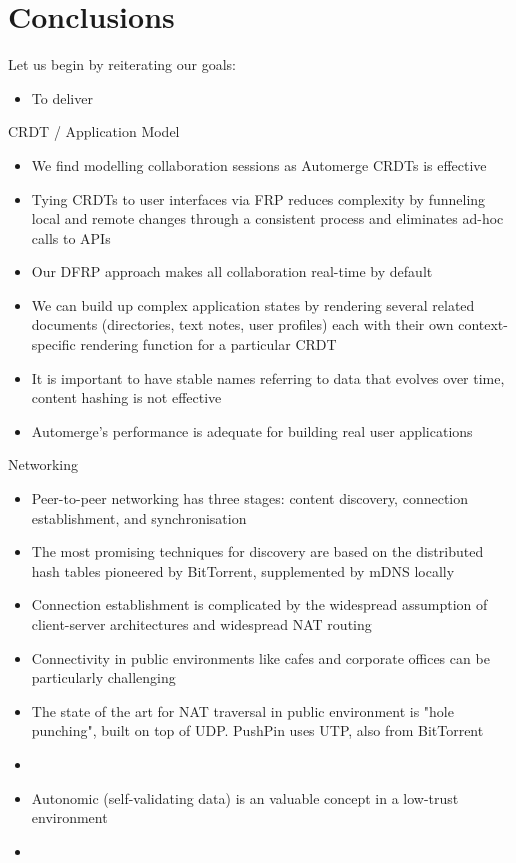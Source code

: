 \documentclass[sigplan,10pt]{acmart}
\begin{document}
\section{Conclusions}

Let us begin by reiterating our goals:
\begin{itemize}
    \item To deliver 
\end{itemize}

CRDT / Application Model
\begin{itemize}
	\item We find modelling collaboration sessions as Automerge CRDTs is effective
	\item Tying CRDTs to user interfaces via FRP reduces complexity by funneling local and remote changes through a consistent process and eliminates ad-hoc calls to APIs
	\item Our DFRP approach makes all collaboration real-time by default
	\item We can build up complex application states by rendering several related documents (directories, text notes, user profiles) each with their own context-specific rendering function for a particular CRDT
	\item It is important to have stable names referring to data that evolves over time, content hashing is not effective
	\item Automerge's performance is adequate for building real user applications
\end{itemize}

Networking
\begin{itemize}
    \item Peer-to-peer networking has three stages: content discovery, connection establishment, and synchronisation
    \item The most promising techniques for discovery are based on the distributed hash tables pioneered by BitTorrent, supplemented by mDNS locally
    \item Connection establishment is complicated by the widespread assumption of client-server architectures and widespread NAT routing
    \item Connectivity in public environments like cafes and corporate offices can be particularly challenging 
    \item The state of the art for NAT traversal in public environment is "hole punching", built on top of UDP. PushPin uses UTP, also from BitTorrent
    \item 
    \item Autonomic (self-validating data) is an valuable concept in a low-trust environment
	\item 
\end{itemize}
\end{document}
